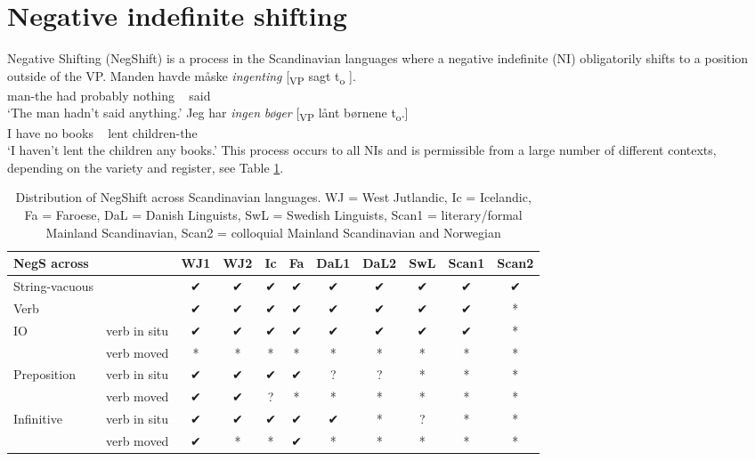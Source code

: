 \documentclass[12pt, letterpaper]{article}
\begin{document}
\section{Negative indefinite shifting} \label{sec:NEGSHIFT}
\ea Negative Shifting (NegShift) is a process in the Scandinavian languages where a negative indefinite (NI) obligatorily shifts to a position outside of the VP.
	\ea
	\gll Manden havde måske \textit{ingenting} [\textsubscript{VP} sagt t\textsubscript{o} ].\\
	man-the had probably nothing ~ said\\
	\glt `The man hadn't said anything.'
	\ex 
	\gll Jeg har \textit{ingen} \textit{bøger} [\textsubscript{VP} lånt børnene t\textsubscript{o}.]\\
	I have no books ~ lent children-the\\
	\glt `I haven't lent the children any books.'
	\z
\ex This process occurs to all NIs and is permissible from a large number of different contexts, depending on the variety and register, see Table \ref{tab:Distribution}. 
\begin{table}[!h]
	\centering
	\caption{Distribution of NegShift across Scandinavian languages. WJ = West Jutlandic, Ic = Icelandic, Fa = Faroese, DaL = Danish Linguists, SwL = Swedish Linguists, Scan1 = literary/formal Mainland Scandinavian, Scan2 = colloquial Mainland Scandinavian and Norwegian}
	\label{tab:Distribution}
\begin{tabular}{llccccccccc}
	\hline 
	NegS across &  & WJ1 & WJ2 & Ic & Fa & DaL1 & DaL2 & SwL & Scan1 & Scan2 \\ 
	\hline 
	String-vacuous &  & ✔︎ & ✔︎ & ✔︎ & ✔︎ & ✔︎ & ✔︎ & ✔︎ & ✔︎ & ✔︎ \\ 
	Verb &  & ✔︎ & ✔︎ & ✔︎ & ✔︎ & ✔︎ & ✔︎ & ✔︎ & ✔︎ & * \\ 
	IO & verb in situ & ✔︎ & ✔︎ & ✔︎ & ✔︎ & ✔︎ & ✔︎ & ✔︎ & ✔︎ & * \\ 
	& verb moved & * & * & * & * & * & * & * & * & * \\ 
	Preposition & verb in situ & ✔︎ & ✔︎ & ✔︎ & ✔︎ & ? & ? & * & * & * \\ 
	& verb moved & ✔︎ & ✔︎ & ? & * & * & * & * & * & * \\ 
	Infinitive & verb in situ & ✔︎ & ✔︎ & ✔︎ & ✔︎ & ✔︎ & * & ? & * & * \\ 
	& verb moved & ✔︎ & * & * & ✔︎ & * & * & * & * & * \\ 
	\hline 
\end{tabular} 
\end{table}
\end{document}
